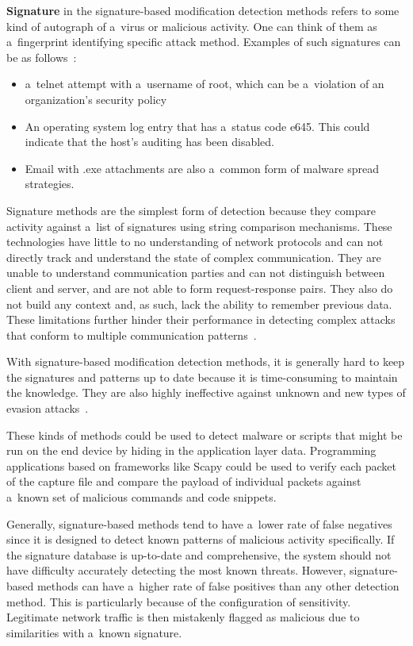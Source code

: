 \documentclass[
  printed,     %
  color,       %
  oneside,     %
  nosansbold,  %
  nocolorbold, %
  nolof,         %
  nolot,         %
]{fithesis4}
\begin{document}
\textbf{Signature} in the signature-based modification detection methods refers to some kind of autograph of a~virus or malicious activity. One can think of them as a~fingerprint identifying specific attack method. Examples of such signatures can be as follows~\cite{gtidaps}:

\begin{itemize}[noitemsep,topsep=0pt]
    \item a~telnet attempt with a~username of root, which can be a~violation of an organization's security policy
    \item An operating system log entry that has a~status code e645. This could indicate that the host's auditing has been disabled.
    \item Email with .exe attachments are also a~common form of malware spread strategies.
\end{itemize}

Signature methods are the simplest form of detection because they compare activity against a~list of signatures using string comparison mechanisms. These technologies have little to no understanding of network protocols and can not directly track and understand the state of complex communication. They are unable to understand communication parties and can not distinguish between client and server, and are not able to form request-response pairs. They also do not build any context and, as such, lack the ability to remember previous data. These limitations further hinder their performance in detecting complex attacks that conform to multiple communication patterns~\cite{gtidaps}.

With signature-based modification detection methods, it is generally hard to keep the signatures and patterns up to date because it is time-consuming to maintain the knowledge. They are also highly ineffective against unknown and new types of evasion attacks~\cite{LIAO201316}.

These kinds of methods could be used to detect malware or scripts that might be run on the end device by hiding in the application layer data. Programming applications based on frameworks like Scapy could be used to verify each packet of the capture file and compare the payload of individual packets against a~known set of malicious commands and code snippets.

Generally, signature-based methods tend to have a~lower rate of false negatives since it is designed to detect known patterns of malicious activity specifically. If the signature database is up-to-date and comprehensive, the system should not have difficulty accurately detecting the most known threats. However, signature-based methods can have a~higher rate of false positives than any other detection method. This is particularly because of the configuration of sensitivity. Legitimate network traffic is then mistakenly flagged as malicious due to similarities with a~known signature. 
\end{document}
